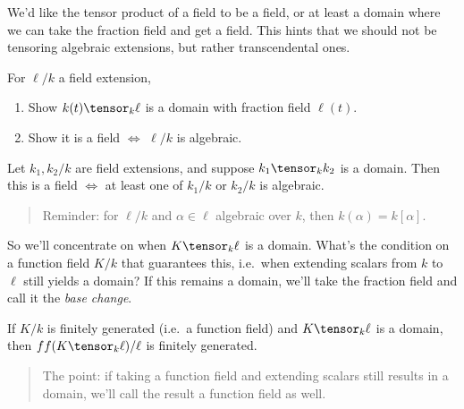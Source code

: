 \begin{remark}

We'd like the tensor product of a field to be a field, or at least a
domain where we can take the fraction field and get a field. This hints
that we should not be tensoring algebraic extensions, but rather
transcendental ones.

\end{remark}

\begin{exercise}

For \(\ell/k\) a field extension,

\begin{enumerate}
\def\labelenumi{\alph{enumi}.}
\item
  Show \(k(t) \tensor_k \ell\) is a domain with fraction field
  \(\ell(t)\).
\item
  Show it is a field \(\iff\) \(\ell/k\) is algebraic.
\end{enumerate}

\end{exercise}

\begin{proposition}[FT 12.7, 12.8]

Let \(k_1, k_2 / k\) are field extensions, and suppose
\(k_1 \tensor_k k_2\) is a domain. Then this is a field \(\iff\) at
least one of \(k_1/k\) or \(k_2/k\) is algebraic.

\end{proposition}

\begin{quote}
Reminder: for \(\ell/k\) and \(\alpha\in \ell\) algebraic over \(k\),
then \(k(\alpha) = k[\alpha]\).
\end{quote}

So we'll concentrate on when \(K \tensor_k \ell\) is a domain. What's
the condition on a function field \(K/k\) that guarantees this,
i.e.~when extending scalars from \(k\) to \(\ell\) still yields a
domain? If this remains a domain, we'll take the fraction field and call
it the \emph{base change}.

\begin{exercise}

If \(K/k\) is finitely generated (i.e.~a function field) and
\(K\tensor_k \ell\) is a domain, then \(ff(K\tensor_k \ell)/\ell\) is
finitely generated.

\begin{quote}
The point: if taking a function field and extending scalars still
results in a domain, we'll call the result a function field as well.
\end{quote}

\end{exercise}

